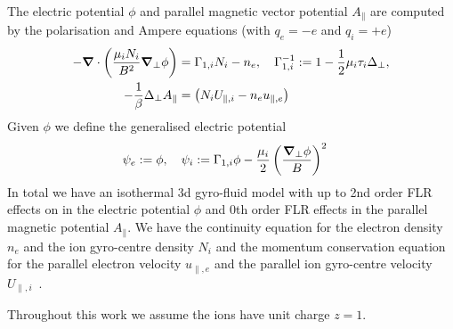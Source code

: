 The electric potential \(\phi\) and parallel magnetic vector potential \(A_\parallel\) are
computed by the polarisation and Ampere equations (with $q_e=-e$ and $q_i=+e$)
\begin{align}
 -{\boldsymbol{\nabla}}\cdot\left(\frac{\mu_iN_i}{B^2} {\boldsymbol{\nabla}}_{\perp} \phi\right) &=  \Gamma_{1,i} N_i -n_e, \quad \Gamma_{1,i}^{-1} := 1-\frac{1}{2}\mu_i\tau_i\Delta_\perp , \\
  -\frac{1}{\beta} \Delta_\perp A_\parallel &= \left(N_i U_{\parallel,i}-n_e u_{\parallel,e} \right)
  \label{eq:polarisation_dimensional}
\end{align}
Given $\phi$ we define the generalised electric potential
\begin{align}
    \psi_e := \phi,\quad \psi_i&:= \Gamma_{1,i} \phi - \frac{\mu_i }{2}\left(\frac{{\boldsymbol{\nabla}}_{\perp}\phi}{B}\right)^2
\end{align}
In total
we have an isothermal 3d gyro-fluid model with up to 2nd order FLR effects
on in the electric potential $\phi$ and 0th order FLR effects in the parallel magnetic
potential $A_\parallel$.
We have the continuity equation for the electron density \(n_e\) and the ion gyro-centre
density \(N_i\) and the momentum conservation equation for
the parallel electron velocity \(u_{\parallel,e}\) and the parallel ion gyro-centre velocity \(U_{\parallel,i}\)~\cite{WiesenbergerPhD, HeldPhD}.
\begin{tcolorbox}[title=Note]
    Throughout this work we assume the ions have unit charge $z=1$.
\end{tcolorbox}
